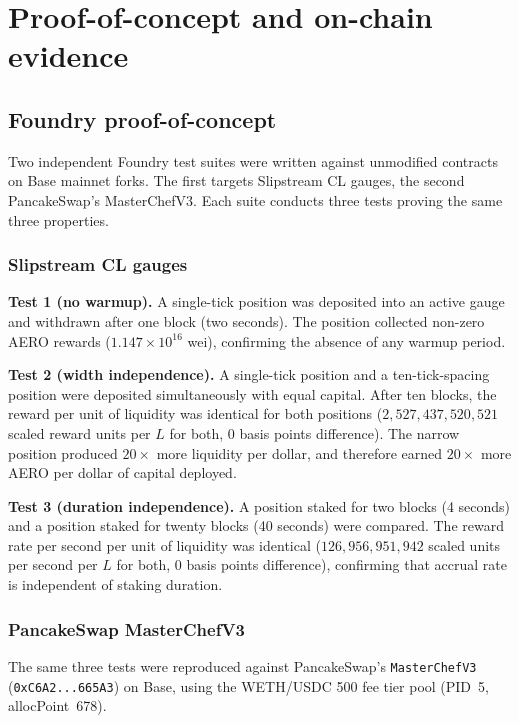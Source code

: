 \documentclass[11pt,a4paper]{article}
\theoremstyle{definition}
\begin{document}
\section{Proof-of-concept and on-chain evidence}\label{sec:poc}

\subsection{Foundry proof-of-concept}\label{sec:foundry}

Two independent Foundry test suites were written against unmodified contracts on Base mainnet forks. The first targets Slipstream CL gauges, the second PancakeSwap's MasterChefV3. Each suite conducts three tests proving the same three properties.

\subsubsection*{Slipstream CL gauges}

\textbf{Test 1 (no warmup).} A single-tick position was deposited into an active gauge and withdrawn after one block (two seconds). The position collected non-zero AERO rewards ($1.147 \times 10^{16}$ wei), confirming the absence of any warmup period.

\textbf{Test 2 (width independence).} A single-tick position and a ten-tick-spacing position were deposited simultaneously with equal capital. After ten blocks, the reward per unit of liquidity was identical for both positions ($2{,}527{,}437{,}520{,}521$ scaled reward units per $L$ for both, 0 basis points difference). The narrow position produced $20\times$ more liquidity per dollar, and therefore earned $20\times$ more AERO per dollar of capital deployed.

\textbf{Test 3 (duration independence).} A position staked for two blocks (4 seconds) and a position staked for twenty blocks (40 seconds) were compared. The reward rate per second per unit of liquidity was identical ($126{,}956{,}951{,}942$ scaled units per second per $L$ for both, 0 basis points difference), confirming that accrual rate is independent of staking duration.

\subsubsection*{PancakeSwap MasterChefV3}

The same three tests were reproduced against PancakeSwap's \texttt{MasterChefV3} (\texttt{0xC6A2...665A3}) on Base, using the WETH/USDC 500 fee tier pool (PID~5, allocPoint~678).
\end{document}
